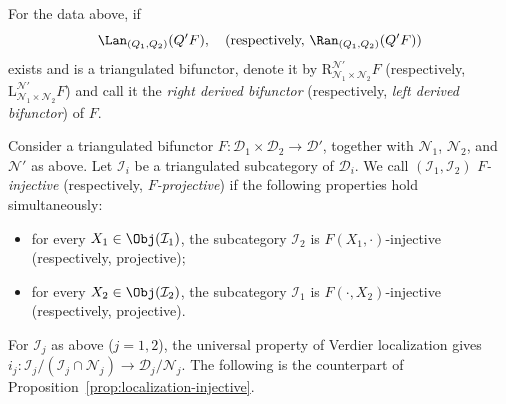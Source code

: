 \begin{definition}\label{def:bifunctor-triangulated-localization}
	For the data above, if
	\[ \Lan_{(Q_1, Q_2)} (Q' F), \quad \text{(respectively, $\Ran_{(Q_1, Q_2)}(Q' F)$)} \]
	exists and is a triangulated bifunctor, denote it by
	$\mathrm{R}^{\mathcal{N}'}_{\mathcal{N}_1\times\mathcal{N}_2}F$
	(respectively,
	$\mathrm{L}^{\mathcal{N}'}_{\mathcal{N}_1\times\mathcal{N}_2}F$) and call
	it the \emph{right derived bifunctor} (respectively, \emph{left derived
	bifunctor}) of $F$.
\end{definition}

\begin{definition}\label{def:F-injective-bifunctor}
	Consider a triangulated bifunctor
	$F:\mathcal{D}_1\times\mathcal{D}_2\to\mathcal{D}'$, together with
	$\mathcal{N}_1$, $\mathcal{N}_2$, and $\mathcal{N}'$ as above. Let
	$\mathcal{I}_i$ be a triangulated subcategory of $\mathcal{D}_i$. We call
	$(\mathcal{I}_1,\mathcal{I}_2)$ \emph{$F$-injective} (respectively,
	\emph{$F$-projective}) if the following properties hold simultaneously:
	\begin{itemize}
		\item for every $X_1\in\Obj(\mathcal{I}_1)$, the subcategory
		$\mathcal{I}_2$ is $F(X_1,\cdot)$-injective (respectively, projective);
		\item for every $X_2\in\Obj(\mathcal{I}_2)$, the subcategory
		$\mathcal{I}_1$ is $F(\cdot,X_2)$-injective (respectively, projective).
	\end{itemize}
\end{definition}

For $\mathcal{I}_j$ as above ($j=1,2$), the universal property of Verdier
localization gives
$i_j:\mathcal{I}_j/(\mathcal{I}_j\cap\mathcal{N}_j)
\to\mathcal{D}_j/\mathcal{N}_j$. The following is the counterpart of
Proposition~\ref{prop:localization-injective}.

